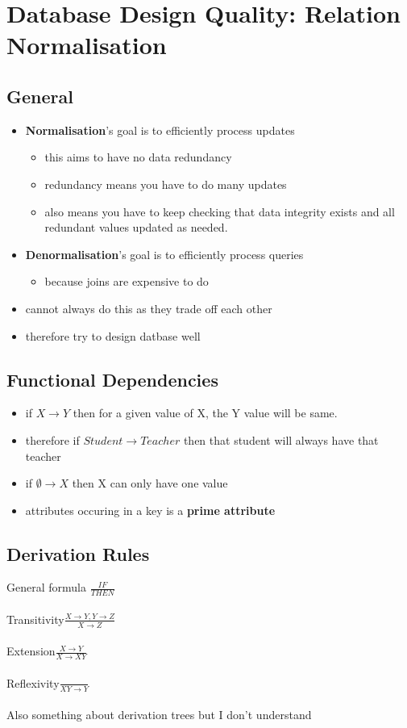 \documentclass{article}
\newcommand\tab[1][0.5cm]{\hspace*{#1}}
\begin{document}
\section{Database Design Quality: Relation Normalisation}
	\subsection{General}
		\begin{itemize}
			\item \textbf{Normalisation}'s goal is to efficiently process updates
				\begin{itemize}
					\item this aims to have no data redundancy
					\item redundancy means you have to do many updates
					\item also means you have to keep checking that data integrity exists and all redundant values updated as needed.
				\end{itemize}
			\item \textbf{Denormalisation}'s goal is to efficiently process queries
				\begin{itemize}
					\item because joins are expensive to do
				\end{itemize}
			\item cannot always do this as they trade off each other
			\item therefore try to design datbase well 
		\end{itemize}

	\subsection{Functional Dependencies}
		\begin{itemize}
			\item if $X \rightarrow Y$ then for a given value of X, the Y value will be same.
			\item therefore if $Student \rightarrow Teacher$ then that student will always have that teacher
			\item if $\emptyset \rightarrow X$ then X can only have one value
			\item attributes occuring in a key is a \textbf{prime attribute}

		\end{itemize}

	\subsection{Derivation Rules}
		General formula \tab $\frac{IF}{THEN}$
		\\\\Transitivity\tab$\frac{X \rightarrow Y, Y \rightarrow Z}{X \rightarrow Z}$
		\\\\Extension\tab$\frac{X \rightarrow Y}{X \rightarrow XY}$
		\\\\Reflexivity\tab$\frac{}{XY \rightarrow Y}$
		\\\\Also something about derivation trees but I don't understand
\end{document}
